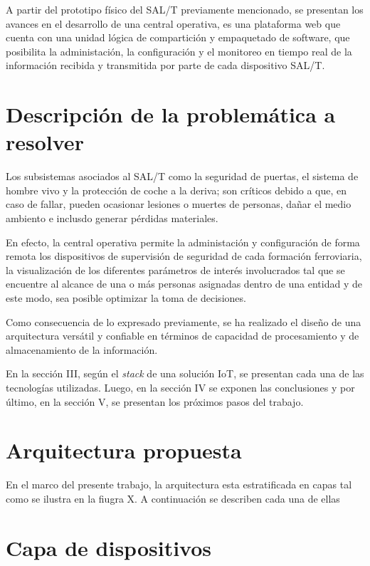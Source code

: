\documentclass[10pt, a4paper, twocolumn]{article} %
\begin{document}
A partir del prototipo físico del SAL/T previamente mencionado, se presentan los avances en el desarrollo de una central operativa, es una plataforma web que cuenta con una unidad lógica de compartición y empaquetado de software, que posibilita la administación, la configuración y el monitoreo en tiempo real de la información recibida y transmitida por parte de cada dispositivo SAL/T.

\section{Descripción de la problemática a resolver}

Los subsistemas asociados al SAL/T como la seguridad de puertas, el sistema de hombre vivo y la protección de coche a la deriva; son críticos debido a que, en caso de fallar, pueden ocasionar lesiones o muertes de personas, dañar el medio ambiento e inclusdo generar pérdidas materiales. 

En efecto, la central operativa permite la administación y configuración de forma remota los dispositivos de supervisión de seguridad de cada formación ferroviaria, la visualización de los diferentes parámetros de interés involucrados tal que se encuentre al alcance de una o más personas asignadas dentro de una entidad y de este modo, sea posible optimizar la toma de decisiones.

Como consecuencia de lo expresado previamente, se ha realizado el diseño de una arquitectura versátil y confiable en términos de capacidad de procesamiento y de almacenamiento de la información.

En la sección III, según el \textit{stack} de una solución IoT, se presentan cada una de las tecnologías utilizadas. Luego, en la sección IV se exponen las conclusiones y por último, en la sección V, se presentan los próximos pasos del trabajo.


\section{Arquitectura propuesta}

En el marco del presente trabajo, la arquitectura esta estratificada en capas
tal como se ilustra en la fiugra X. A continuación se describen cada una de ellas

\section{Capa de dispositivos}
\end{document}
